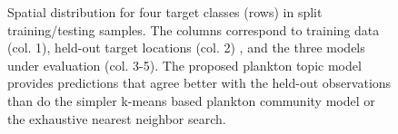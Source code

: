 \begin{figure}
    \centering
    \caption{Spatial distribution for four target classes (rows) in split training/testing samples. The columns correspond to training data (col. 1), held-out target locations (col. 2) , and the three models under evaluation (col. 3-5). The proposed plankton topic model provides predictions that agree better with the held-out observations than do the simpler k-means based plankton community model or the exhaustive nearest neighbor search.}
    \label{fig:plankton-pisces-maps-1}
\end{figure}

